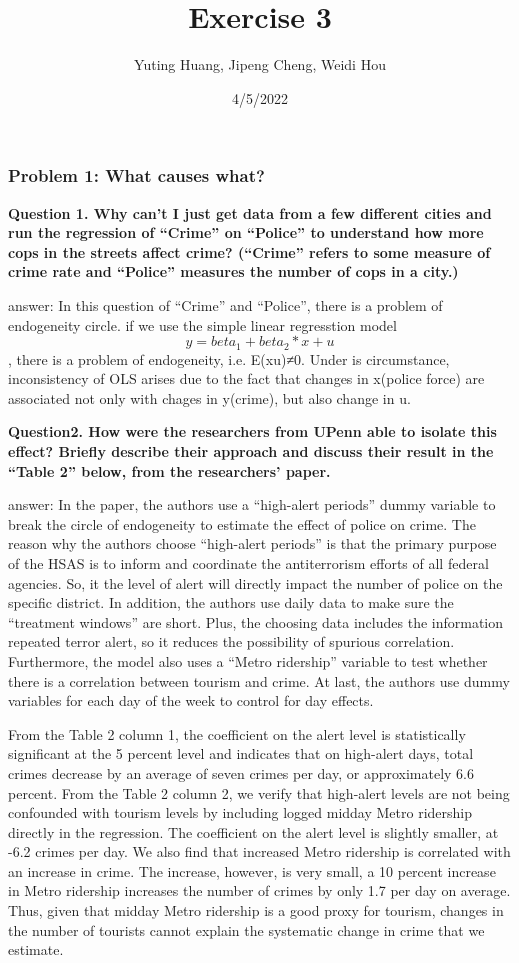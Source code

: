 \documentclass[
]{article}
\title{Exercise 3}
\author{Yuting Huang, Jipeng Cheng, Weidi Hou}
\date{4/5/2022}
\begin{document}
\maketitle

\hypertarget{problem-1-what-causes-what}{%
\subsubsection{Problem 1: What causes
what?}\label{problem-1-what-causes-what}}

\textbf{Question 1. Why can't I just get data from a few different
cities and run the regression of ``Crime'' on ``Police'' to understand
how more cops in the streets affect crime? (``Crime'' refers to some
measure of crime rate and ``Police'' measures the number of cops in a
city.)}

answer: In this question of ``Crime'' and ``Police'', there is a problem
of endogeneity circle. if we use the simple linear regresstion model
\[y=beta_1+beta_2 * x+u\], there is a problem of endogeneity, i.e.
E(xu)≠0. Under is circumstance, inconsistency of OLS arises due to the
fact that changes in x(police force) are associated not only with chages
in y(crime), but also change in u.

\textbf{Question2. How were the researchers from UPenn able to isolate
this effect? Briefly describe their approach and discuss their result in
the ``Table 2'' below, from the researchers' paper.}

answer: In the paper, the authors use a ``high-alert periods'' dummy
variable to break the circle of endogeneity to estimate the effect of
police on crime. The reason why the authors choose ``high-alert
periods'' is that the primary purpose of the HSAS is to inform and
coordinate the antiterrorism efforts of all federal agencies. So, it the
level of alert will directly impact the number of police on the specific
district. In addition, the authors use daily data to make sure the
``treatment windows'' are short. Plus, the choosing data includes the
information repeated terror alert, so it reduces the possibility of
spurious correlation. Furthermore, the model also uses a ``Metro
ridership'' variable to test whether there is a correlation between
tourism and crime. At last, the authors use dummy variables for each day
of the week to control for day effects.

From the Table 2 column 1, the coefficient on the alert level is
statistically significant at the 5 percent level and indicates that on
high-alert days, total crimes decrease by an average of seven crimes per
day, or approximately 6.6 percent. From the Table 2 column 2, we verify
that high-alert levels are not being confounded with tourism levels by
including logged midday Metro ridership directly in the regression. The
coefficient on the alert level is slightly smaller, at -6.2 crimes per
day. We also find that increased Metro ridership is correlated with an
increase in crime. The increase, however, is very small, a 10 percent
increase in Metro ridership increases the number of crimes by only 1.7
per day on average. Thus, given that midday Metro ridership is a good
proxy for tourism, changes in the number of tourists cannot explain the
systematic change in crime that we estimate.
\end{document}
